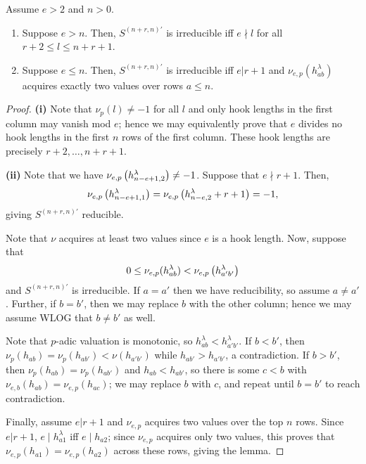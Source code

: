\documentclass{amsart}
\begin{document}
\begin{corollary}\label{S irreducibility}
  Assume $e > 2$ and $n > 0$.
  
  \begin{enumerate}[label={(\roman*)}]
    \item Suppose $e > n$.
      Then, $S^{(n+r,n)'}$ is irreducible iff $e \nmid l$ for all $r + 2 \leq l \leq n + r + 1$.
    \item Suppose $e \leq n$.
      Then, $S^{(n+r,n)'}$ is irreducible iff $e | r + 1$ and $\nu_{e,p}(h_{ab}^\lambda)$ acquires exactly two values over rows $a \leq n$.
  \end{enumerate}  
\end{corollary}
\begin{proof}
  \textbf{(i)}
  Note that $\nu_p(l) \neq -1$ for all $l$ and only hook lengths in the first column may vanish mod $e$;
  hence we may equivalently prove that $e$ divides no hook lengths in the first $n$ rows of the first column.
  These hook lengths are precisely $r + 2,\dots,n+r+1$.

  \textbf{(ii)}
  Note that we have $\nu_{e,p}\left( h^\lambda_{n-e+1,2} \right) \neq -1$.
  Suppose that $e \nmid r + 1$.
  Then, \[\nu_{e,p}\left( h^\lambda_{n-e+1,1} \right) = \nu_{e,p}\left( h^\lambda_{n-e,2} + r + 1 \right) = -1,\]
  giving $S^{(n+r,n)'}$ reducible.

  Note that $\nu$ acquires at least two values since $e$ is a hook length.
  Now, suppose that \[0 \leq \nu_{e,p}(h^{\lambda}_{ab}) < \nu_{e,p}\left( h^{\lambda}_{a'b'} \right)\] and $S^{(n+r,n)'}$ is irreducible.
  If $a=a'$ then we have reducibility, so assume $a \neq a'$.
  Further, if $b = b'$, then we may replace $b$ with the other column;
  hence we may assume WLOG that $b \neq b'$ as well.

  Note that $p$-adic valuation is monotonic, so $h^\lambda_{ab} < h^\lambda_{a'b'}$.
  If $b < b'$, then $\nu_p(h_{ab}) = \nu_p(h_{ab'}) < \nu(h_{a'b'})$ while $h_{ab'} > h_{a'b'}$, a contradiction.
  If $b > b'$, then $\nu_p(h_{ab}) = \nu_p(h_{ab'})$ and $h_{ab} < h_{ab'}$, so there is some $c < b$ with $\nu_{e,b}(h_{ab}) = \nu_{e,p}(h_{ac})$; we may replace $b$ with $c$, and repeat until $b = b'$ to reach contradiction.

  Finally, assume $e | r + 1$ and $\nu_{e,p}$ acquires two values over the top $n$ rows.
  Since $e | r + 1$, $e \mid h_{a1}^\lambda$ iff $e \mid h_{a2}$;
  since $\nu_{e,p}$ acquires only two values, this proves that $\nu_{e,p}(h_{a1}) = \nu_{e,p}(h_{a2})$ across these rows, giving the lemma.
\end{proof}
\end{document}
